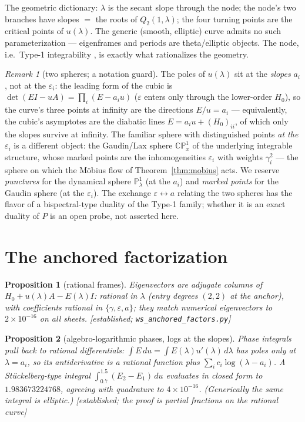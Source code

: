 \documentclass[11pt]{article}
\newtheorem{proposition}{Proposition}
\theoremstyle{definition}
\theoremstyle{remark}
\newtheorem{remark}{Remark}
\newcommand{\eps}{\varepsilon}
\newcommand{\C}{\mathbb{C}}
\newcommand{\PP}{\mathbb{P}^1}
\newcommand{\evidence}[1]{\textnormal{\small[\textit{#1}]}}
\begin{document}
The geometric dictionary: $\lambda$ is the secant slope through the node; the node's two
branches have slopes $=$ the roots of $Q_2(1,\lambda)$; the four turning points are the
critical points of $u(\lambda)$. The generic (smooth, elliptic) curve admits no such
parameterization --- eigenframes and periods are theta/elliptic objects. The node, i.e.\
Type-1 integrability \cite{OWY2009}, is exactly what rationalizes the geometry.

\begin{remark}[two spheres; a notation guard]\label{rem:twospheres}
The poles of $u(\lambda)$ sit at the \emph{slopes} $a_i$, not at the $\eps_i$: the leading
form of the cubic is $\det(EI-uA)=\prod_i(E-a_iu)$ ($\eps$ enters only through the
lower-order $H_0$), so the curve's three points at infinity are the directions
$E/u=a_i$ --- equivalently, the cubic's asymptotes are the diabatic lines
$E=a_iu+(H_0)_{ii}$, of which only the slopes survive at infinity. The familiar sphere
with distinguished points \emph{at the} $\eps_i$ is a different object: the Gaudin/Lax
sphere $\C\mathbb{P}^1_x$ of the underlying integrable structure, whose marked points are
the inhomogeneities $\eps_i$ with weights $\gamma_i^2$ --- the sphere on which the
M\"obius flow of Theorem~\ref{thm:mobius} acts. We reserve \emph{punctures} for the
dynamical sphere $\PP_\lambda$ (at the $a_i$) and \emph{marked points} for the Gaudin
sphere (at the $\eps_i$). The exchange $\eps\leftrightarrow a$ relating the two spheres
has the flavor of a bispectral-type duality of the Type-1 family; whether it is an exact
duality of $P$ is an open probe, not asserted here.
\end{remark}

\section{The anchored factorization}\label{sec:fact}

\begin{proposition}[rational frames]\label{prop:frames}
Eigenvectors are adjugate columns of $H_0+u(\lambda)A-E(\lambda)I$: rational in
$\lambda$ (entry degrees $(2,2)$ at the anchor), with coefficients rational in
$\{\gamma,\eps,a\}$; they match numerical eigenvectors to $2\times10^{-16}$ on all
sheets. \evidence{established; \texttt{ws\_anchored\_factors.py}}
\end{proposition}

\begin{proposition}[algebro-logarithmic phases, logs at the slopes]\label{prop:phases}
Phase integrals pull back to rational differentials:
$\int E\,du=\int E(\lambda)u'(\lambda)\,d\lambda$ has poles only at $\lambda=a_i$, so
its antiderivative is a rational function plus $\sum_ic_i\log(\lambda-a_i)$. A
St\"uckelberg-type integral $\int_{0.7}^{1.5}(E_2-E_1)\,du$ evaluates in closed form to
$1.983673224768$, agreeing with quadrature to $4\times10^{-16}$. (Generically the same
integral is elliptic.) \evidence{established; the proof is partial fractions on the
rational curve}
\end{proposition}
\end{document}
